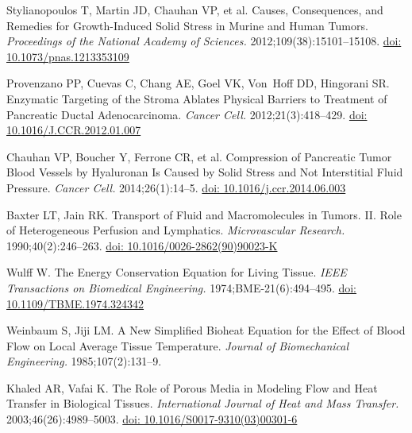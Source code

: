 \documentclass[Times1COL,AMA]{WileyNJDv5} %
\begin{document}
\begin{thebibliography}{10}
    Stylianopoulos T, Martin JD, Chauhan VP, et al. Causes, Consequences, and
    Remedies for Growth-Induced Solid Stress in Murine and Human Tumors. {\it
            Proceedings of the National Academy of Sciences.}
    2012\string;109(38)\string:15101--15108.
    \newblock \href {\doibase 10.1073/pnas.1213353109} {doi:
        10.1073/pnas.1213353109}

    Provenzano PP, Cuevas C, Chang AE, Goel VK, Von~Hoff DD, Hingorani SR.
    Enzymatic {{Targeting}} of the {{Stroma Ablates Physical Barriers}} to
        {{Treatment}} of {{Pancreatic Ductal Adenocarcinoma}}. {\it Cancer Cell.}
    2012\string;21(3)\string:418--429.
    \newblock \href {\doibase 10.1016/J.CCR.2012.01.007} {doi:
        10.1016/J.CCR.2012.01.007}

    Chauhan VP, Boucher Y, Ferrone CR, et al. Compression of Pancreatic Tumor Blood
    Vessels by Hyaluronan Is Caused by Solid Stress and Not Interstitial Fluid
    Pressure. {\it Cancer Cell.} 2014\string;26(1)\string:14--5.
    \newblock \href {\doibase 10.1016/j.ccr.2014.06.003} {doi:
        10.1016/j.ccr.2014.06.003}

    Baxter LT, Jain RK. Transport of Fluid and Macromolecules in Tumors. {{II}}.
    {{Role}} of Heterogeneous Perfusion and Lymphatics. {\it Microvascular
            Research.} 1990\string;40(2)\string:246--263.
    \newblock \href {\doibase 10.1016/0026-2862(90)90023-K} {doi:
        10.1016/0026-2862(90)90023-K}

    Wulff W. The {{Energy Conservation Equation}} for {{Living Tissue}}. {\it IEEE
    Transactions on Biomedical Engineering.}
    1974\string;BME-21(6)\string:494--495.
    \newblock \href {\doibase 10.1109/TBME.1974.324342} {doi:
        10.1109/TBME.1974.324342}

    Weinbaum S, Jiji LM. A New Simplified Bioheat Equation for the Effect of Blood
    Flow on Local Average Tissue Temperature. {\it Journal of Biomechanical
            Engineering.} 1985\string;107(2)\string:131--9.

    Khaled AR, Vafai K. The Role of Porous Media in Modeling Flow and Heat Transfer
    in Biological Tissues. {\it International Journal of Heat and Mass Transfer.}
    2003\string;46(26)\string:4989--5003.
    \newblock \href {\doibase 10.1016/S0017-9310(03)00301-6} {doi:
        10.1016/S0017-9310(03)00301-6}


\end{thebibliography}
\end{document}
